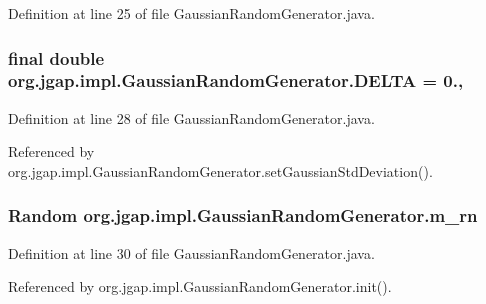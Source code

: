 Definition at line 25 of file Gaussian\-Random\-Generator.\-java.

\hypertarget{classorg_1_1jgap_1_1impl_1_1_gaussian_random_generator_adda7e9fd5a5b01d4a8ea3706ec5dc6f8}{
\subsubsection[{D\-E\-L\-T\-A}]{\setlength{\rightskip}{0pt plus 5cm}final double org.\-jgap.\-impl.\-Gaussian\-Random\-Generator.\-D\-E\-L\-T\-A = 0.\hspace{0.3cm}{\ttfamily [static]}, {\ttfamily [private]}}}\label{classorg_1_1jgap_1_1impl_1_1_gaussian_random_generator_adda7e9fd5a5b01d4a8ea3706ec5dc6f8}


Definition at line 28 of file Gaussian\-Random\-Generator.\-java.



Referenced by org.\-jgap.\-impl.\-Gaussian\-Random\-Generator.\-set\-Gaussian\-Std\-Deviation().

\hypertarget{classorg_1_1jgap_1_1impl_1_1_gaussian_random_generator_a37f7ceea3a0a9230371f2de2ee947ed0}{
\subsubsection[{m\-\_\-rn}]{\setlength{\rightskip}{0pt plus 5cm}Random org.\-jgap.\-impl.\-Gaussian\-Random\-Generator.\-m\-\_\-rn\hspace{0.3cm}{\ttfamily [private]}}}\label{classorg_1_1jgap_1_1impl_1_1_gaussian_random_generator_a37f7ceea3a0a9230371f2de2ee947ed0}


Definition at line 30 of file Gaussian\-Random\-Generator.\-java.



Referenced by org.\-jgap.\-impl.\-Gaussian\-Random\-Generator.\-init().

